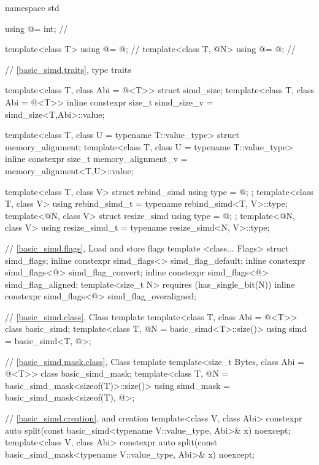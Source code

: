 \begin{codeblock}
namespace std {
  using @\simdsizetype@ = int; // \expos

  template<class T> using @\nativeabi@ = @\seebelow@; // \expos
  template<class T, @\simdsizetype@ N> using @\deducet@ = @\seebelow@; // \expos

  // \ref{basic_simd.traits},  type traits

  template<class T, class Abi = @\nativeabi@<T>> struct simd_size;
  template<class T, class Abi = @\nativeabi@<T>>
    inline constexpr size_t simd_size_v = simd_size<T,Abi>::value;

  template<class T, class U = typename T::value_type> struct memory_alignment;
  template<class T, class U = typename T::value_type>
    inline constexpr size_t memory_alignment_v = memory_alignment<T,U>::value;

  template<class T, class V> struct rebind_simd { using type = @\seebelow@; };
  template<class T, class V> using rebind_simd_t = typename rebind_simd<T, V>::type;
  template<@\simdsizetype@ N, class V> struct resize_simd { using type = @\seebelow@; };
  template<@\simdsizetype@ N, class V> using resize_simd_t = typename resize_simd<N, V>::type;

  // \ref{basic_simd.flags}, Load and store flags
  template <class... Flags> struct simd_flags;
  inline constexpr simd_flags<> simd_flag_default{};
  inline constexpr simd_flags<@\seebelow@> simd_flag_convert{};
  inline constexpr simd_flags<@\seebelow@> simd_flag_aligned{};
  template<size_t N> requires (has_single_bit(N))
    inline constexpr simd_flags<@\seebelow@> simd_flag_overaligned{};

  // \ref{basic_simd.class}, Class template 
  template<class T, class Abi = @\nativeabi@<T>> class basic_simd;
  template<class T, @\simdsizetype@ N = basic_simd<T>::size()>
    using simd = basic_simd<T, @>;

  // \ref{basic_simd.mask.class}, Class template 
  template<size_t Bytes, class Abi = @\nativeabi@<T>> class basic_simd_mask;
  template<class T, @\simdsizetype@ N = basic_simd_mask<sizeof(T)>::size()>
    using simd_mask = basic_simd_mask<sizeof(T), @>;

  // \ref{basic_simd.creation},  and  creation
  template<class V, class Abi>
    constexpr auto
      split(const basic_simd<typename V::value_type, Abi>& x) noexcept;
  template<class V, class Abi>
    constexpr auto
      split(const basic_simd_mask<typename V::value_type, Abi>& x) noexcept;

}
\end{codeblock}
